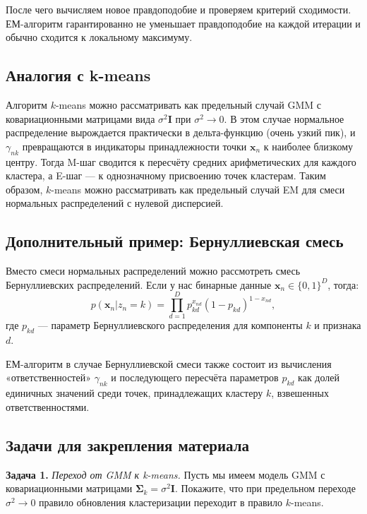 После чего вычисляем новое правдоподобие и проверяем критерий сходимости. ЕМ-алгоритм гарантированно не уменьшает правдоподобие на каждой итерации и обычно сходится к локальному максимуму.

\subsection{Аналогия с k-means}

Алгоритм $k$-means можно рассматривать как предельный случай GMM с ковариационными матрицами вида $\sigma^2 \mathbf{I}$ при $\sigma^2 \to 0$. В этом случае нормальное распределение вырождается практически в дельта-функцию (очень узкий пик), и $\gamma_{nk}$ превращаются в индикаторы принадлежности точки $\mathbf{x}_n$ к наиболее близкому центру. Тогда M-шаг сводится к пересчёту средних арифметических для каждого кластера, а E-шаг --- к однозначному присвоению точек кластерам. Таким образом, $k$-means можно рассматривать как предельный случай EM для смеси нормальных распределений с нулевой дисперсией.

\subsection{Дополнительный пример: Бернуллиевская смесь}

Вместо смеси нормальных распределений можно рассмотреть смесь Бернуллиевских распределений. Если у нас бинарные данные $\mathbf{x}_n \in \{0,1\}^D$, тогда:
\begin{equation*}
    p(\mathbf{x}_n | z_n = k) = \prod_{d=1}^D p_{kd}^{x_{nd}} (1 - p_{kd})^{1 - x_{nd}},
\end{equation*}
где $p_{kd}$ --- параметр Бернуллиевского распределения для компоненты $k$ и признака $d$.

ЕМ-алгоритм в случае Бернуллиевской смеси также состоит из вычисления «ответственностей» $\gamma_{nk}$ и последующего пересчёта параметров $p_{kd}$ как долей единичных значений среди точек, принадлежащих кластеру $k$, взвешенных ответственностями.

\subsection{Задачи для закрепления материала}

\noindent\textbf{Задача 1.} \emph{Переход от GMM к k-means.}
Пусть мы имеем модель GMM с ковариационными матрицами $\boldsymbol{\Sigma}_k = \sigma^2 \mathbf{I}$. Покажите, что при предельном переходе $\sigma^2 \to 0$ правило обновления кластеризации переходит в правило $k$-means. 

